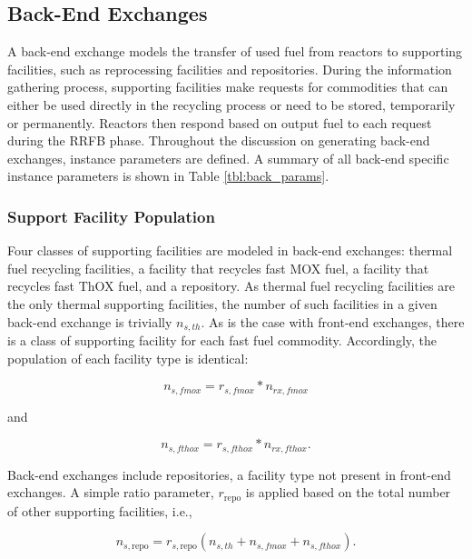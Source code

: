 \subsection{Back-End Exchanges}\label{method:setup:back}

A back-end exchange models the transfer of used fuel from reactors to supporting
facilities, such as reprocessing facilities and repositories. During the
information gathering process, supporting facilities make requests for
commodities that can either be used directly in the recycling process or need to
be stored, temporarily or permanently. Reactors then respond based on output
fuel to each request during the RRFB phase. Throughout the discussion on
generating back-end exchanges, instance parameters are defined. A summary of all
back-end specific instance parameters is shown in Table \ref{tbl:back_params}.

\subsubsection{Support Facility Population}\label{method:setup:back:sup}

Four classes of supporting facilities are modeled in back-end exchanges: thermal
fuel recycling facilities, a facility that recycles fast MOX fuel, a facility
that recycles fast ThOX fuel, and a repository. As thermal fuel recycling
facilities are the only thermal supporting facilities, the number of such
facilities in a given back-end exchange is trivially $n_{s, th}$. As is the case
with front-end exchanges, there is a class of supporting facility for each fast
fuel commodity. Accordingly, the population of each facility type is identical:

\begin{equation}
n_{s, fmox} = r_{s, fmox} * n_{rx, fmox}
\end{equation}

and

\begin{equation}
n_{s, fthox} = r_{s, fthox} * n_{rx, fthox}.
\end{equation}

Back-end exchanges include repositories, a facility type not present in
front-end exchanges. A simple ratio parameter, $r_{\text{repo}}$ is applied
based on the total number of other supporting facilities, i.e.,

\begin{equation}
n_{s, \text{repo}} = r_{s, \text{repo}} ( n_{s, th} + n_{s, fmox} +n_{s, fthox} ).
\end{equation}

